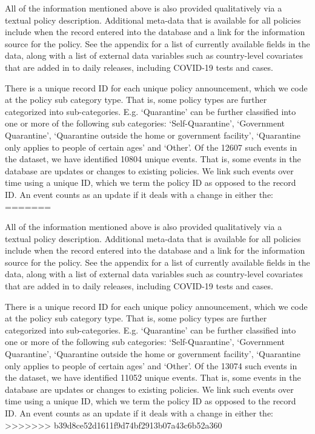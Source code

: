 \documentclass[]{article}
\begin{document}
All of the information mentioned above is also provided qualitatively via a textual policy description. Additional meta-data that is available for all policies include when the record entered into the database and a link for the information source for the policy. See the appendix for a list of currently available fields in the data, along with a list of external data variables such as country-level covariates that are added in to daily releases, including COVID-19 tests and cases.

There is a unique record ID for each unique policy announcement, which we code at the policy sub category type. That is, some policy types are further categorized into sub-categories. E.g. `Quarantine' can be further classified into one or more of the following sub categories: `Self-Quarantine', `Government Quarantine', `Quarantine outside the home or government facility', `Quarantine only applies to people of certain ages' and `Other'. Of the 12607 such events in the dataset, we have identified 10804 unique events. That is, some events in the database are updates or changes to existing policies. We link such events over time using a unique ID, which we term the policy ID as opposed to the record ID. An event counts as an update if it deals with a change in either the:
=======

All of the information mentioned above is also provided qualitatively via a textual policy description. Additional meta-data that is available for all policies include when the record entered into the database and a link for the information source for the policy. See the appendix for a list of currently available fields in the data, along with a list of external data variables such as country-level covariates that are added in to daily releases, including COVID-19 tests and cases.

There is a unique record ID for each unique policy announcement, which we code at the policy sub category type. That is, some policy types are further categorized into sub-categories. E.g. `Quarantine' can be further classified into one or more of the following sub categories: `Self-Quarantine', `Government Quarantine', `Quarantine outside the home or government facility', `Quarantine only applies to people of certain ages' and `Other'. Of the 13074 such events in the dataset, we have identified 11052 unique events. That is, some events in the database are updates or changes to existing policies. We link such events over time using a unique ID, which we term the policy ID as opposed to the record ID. An event counts as an update if it deals with a change in either the:
>>>>>>> b39d8ce52d1611f9d74bf2913b07a43c6b52a360
\end{document}
